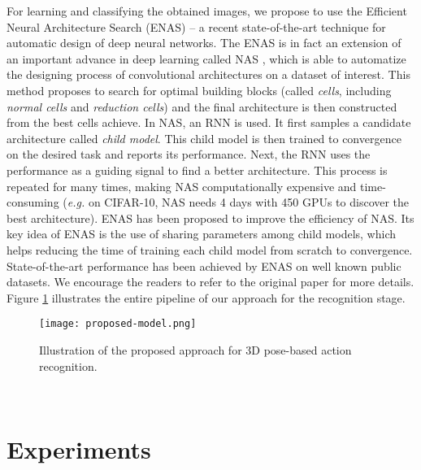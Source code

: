 \documentclass{bmvc2k}
\begin{document}
\hspace*{0.5cm} For learning and classifying the obtained images, we propose to use the Efficient Neural Architecture Search (ENAS) \cite{pmlr-v80-pham18a} -- a recent state-of-the-art technique for automatic design of deep neural networks. The ENAS is in fact an extension of an important advance in deep learning called NAS \cite{Zoph2017NeuralAS}, which is able to automatize the designing process of convolutional architectures on a dataset of interest. This method proposes to search for optimal building blocks (called \textit{cells}, including \textit{normal cells} and \textit{reduction cells}) and the final architecture is then constructed from the best cells achieve. In NAS, an RNN is used. It first samples a candidate architecture called \textit{child model}. This child model is then trained to convergence on the desired task and reports its performance. Next, the RNN uses the performance as a guiding signal to find a better architecture. This process is repeated for many times, making NAS computationally expensive and time-consuming (\textit{e.g.} on CIFAR-10, NAS needs 4 days with 450 GPUs to discover the best architecture). ENAS has been proposed to improve the efficiency of NAS. Its key idea of ENAS \cite{pmlr-v80-pham18a} is the use of sharing parameters among child models, which helps reducing the time of training each child model from scratch to convergence. State-of-the-art performance has been achieved by ENAS on  well known public datasets. We encourage the readers to refer to the original paper \cite{pmlr-v80-pham18a} for more details. Figure \ref{fig:4} illustrates the entire pipeline of our approach for the recognition stage. \\[-0.6cm]
\begin{figure}[ht]
\begin{center}
 \texttt{[image: proposed-model.png]}
 \vspace*{-0.8cm}
\end{center}
   \caption{Illustration of the proposed approach for 3D pose-based action recognition.}
\label{fig:4}
\end{figure}  \\[-1.2cm]
\section{Experiments \\[-0.2cm]} \label{sect:4}
\end{document}
